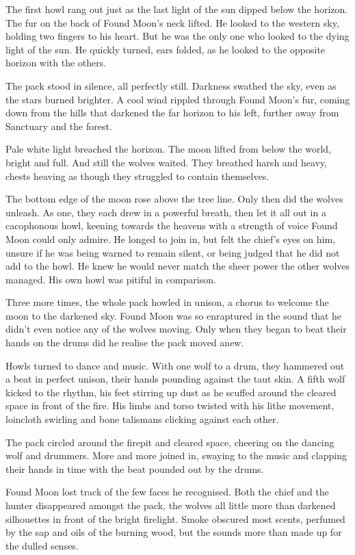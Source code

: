 The first howl rang out just as the last light of the sun dipped below the horizon. The fur on the back of Found Moon's neck lifted. He looked to the western sky, holding two fingers to his heart. But he was the only one who looked to the dying light of the sun. He quickly turned, ears folded, as he looked to the opposite horizon with the others.

The pack stood in silence, all perfectly still. Darkness swathed the sky, even as the stars burned brighter. A cool wind rippled through Found Moon's fur, coming down from the hills that darkened the far horizon to his left, further away from Sanctuary and the forest.

Pale white light breached the horizon. The moon lifted from below the world, bright and full. And still the wolves waited. They breathed harsh and heavy, chests heaving as though they struggled to contain themselves.

The bottom edge of the moon rose above the tree line. Only then did the wolves unleash. As one, they each drew in a powerful breath, then let it all out in a cacophonous howl, keening towards the heavens with a strength of voice Found Moon could only admire. He longed to join in, but felt the chief's eyes on him, unsure if he was being warned to remain silent, or being judged that he did not add to the howl. He knew he would never match the sheer power the other wolves managed. His own howl was pitiful in comparison.

Three more times, the whole pack howled in unison, a chorus to welcome the moon to the darkened sky. Found Moon was so enraptured in the sound that he didn't even notice any of the wolves moving. Only when they began to beat their hands on the drums did he realise the pack moved anew.

Howls turned to dance and music. With one wolf to a drum, they hammered out a beat in perfect unison, their hands pounding against the taut skin. A fifth wolf kicked to the rhythm, his feet stirring up dust as he scuffed around the cleared space in front of the fire. His limbs and torso twisted with his lithe movement, loincloth swirling and bone talismans clicking against each other.

The pack circled around the firepit and cleared space, cheering on the dancing wolf and drummers. More and more joined in, swaying to the music and clapping their hands in time with the beat pounded out by the drums.

Found Moon lost track of the few faces he recognised. Both the chief and the hunter disappeared amongst the pack, the wolves all little more than darkened silhouettes in front of the bright firelight. Smoke obscured most scents, perfumed by the sap and oils of the burning wood, but the sounds more than made up for the dulled senses.


